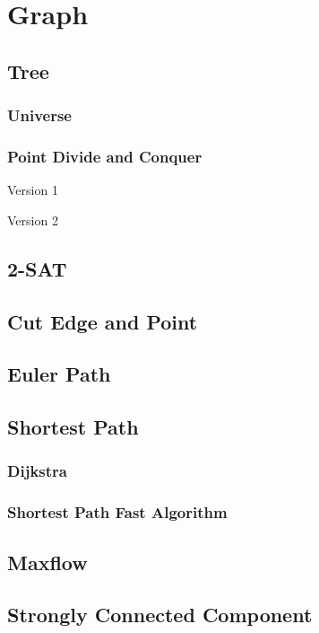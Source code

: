 \section{Graph}
\subsection{Tree}
\subsubsection{Universe}

\subsubsection{Point Divide and Conquer}

Version 1


Version 2


\subsection{2-SAT}


\subsection{Cut Edge and Point}


\subsection{Euler Path}


\subsection{Shortest Path}
\subsubsection{Dijkstra}

\subsubsection{Shortest Path Fast Algorithm}


\subsection{Maxflow}


\subsection{Strongly Connected Component}


